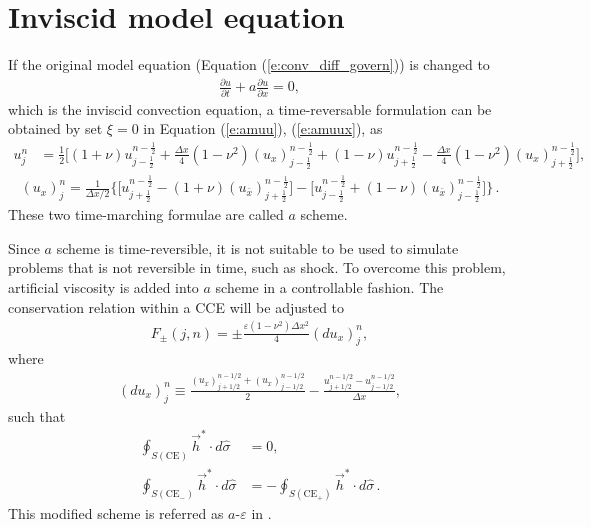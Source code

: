 \documentclass[letterpaper,12pt,dvips]{article}
\numberwithin{equation}{section}
\begin{document}
\section{Inviscid model equation}
\label{s:inviscid_model}

If the original model equation (Equation (\ref{e:conv_diff_govern})) 
is changed to 
\begin{align}
  \frac{\partial u}{\partial t} + a\frac{\partial u}{\partial x} = 0, 
    \label{e:conv_govern}
\end{align}
which is the inviscid convection equation, a time-reversable formulation 
can be obtained by set $\xi=0$ in Equation (\ref{e:amuu}), 
(\ref{e:amuux}), as 
\begin{align}
  u_j^n &= \frac{1}{2}\Big[
      (1+\nu)u_{j-\frac{1}{2}}^{n-\frac{1}{2}} 
    + \frac{\Delta x}{4}(1-\nu^2)(u_x)_{j-\frac{1}{2}}^{n-\frac{1}{2}}
    + (1-\nu)u_{j+\frac{1}{2}}^{n-\frac{1}{2}}
    - \frac{\Delta x}{4}(1-\nu^2)(u_x)_{j+\frac{1}{2}}^{n-\frac{1}{2}}
  \Big], \label{e:au}
\end{align}
\begin{align}
  (u_x)_j^n = \frac{1}{\Delta x/2}\Big\{
      \Big[ u_{j+\frac{1}{2}}^{n-\frac{1}{2}}
         - (1+\nu)(u_{\bar{x}})_{j+\frac{1}{2}}^{n-\frac{1}{2}} \Big]
    - \Big[ u_{j-\frac{1}{2}}^{n-\frac{1}{2}}
         + (1-\nu)(u_{\bar{x}})_{j-\frac{1}{2}}^{n-\frac{1}{2}} \Big]
  \Big\} \label{e:aux}\,.
\end{align}
These two time-marching formulae are called $a$ scheme.

Since $a$ scheme is time-reversible, it is not suitable to be used to 
simulate problems that is not reversible in time, such as shock.
To overcome this problem, artificial viscosity is added into $a$ scheme 
in a controllable fashion.
The conservation relation within a CCE will be adjusted to 
\begin{align}
  F_{\pm}(j,n) = \pm\frac{\varepsilon(1-\nu^2)\Delta x^2}{4}(du_x)_j^n, 
    \label{e:aeconserv}
\end{align}
where
\begin{align*}
  (du_x)_j^n \equiv 
    \frac{(u_x)_{j+1/2}^{n-1/2} + (u_x)_{j-1/2}^{n-1/2}}{2}
  - \frac{u_{j+1/2}^{n-1/2} - u_{j-1/2}^{n-1/2}}        {\Delta x}, 
\end{align*}
such that 
\begin{align*}
    \oint_{S(\mathrm{CE}  )}\vec{h}^*\cdot d\hat{\sigma} &= 0, \\
    \oint_{S(\mathrm{CE}_-)}\vec{h}^*\cdot d\hat{\sigma} &= 
  - \oint_{S(\mathrm{CE}_+)}\vec{h}^*\cdot d\hat{\sigma} \,.
\end{align*}
This modified scheme is referred as $a$-$\varepsilon$ in \cite{b:chang95}.
\end{document}

